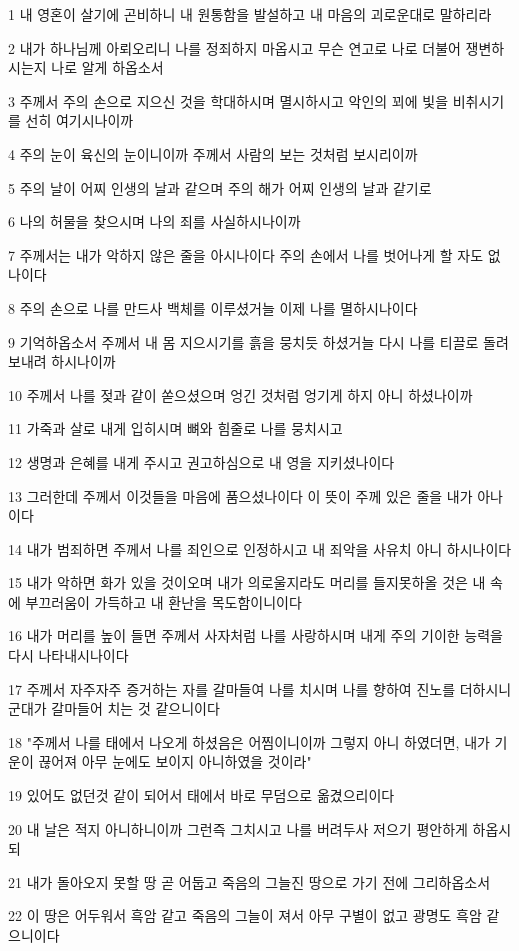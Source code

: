 \par 1 내 영혼이 살기에 곤비하니 내 원통함을 발설하고 내 마음의 괴로운대로 말하리라
\par 2 내가 하나님께 아뢰오리니 나를 정죄하지 마옵시고 무슨 연고로 나로 더불어 쟁변하시는지 나로 알게 하옵소서
\par 3 주께서 주의 손으로 지으신 것을 학대하시며 멸시하시고 악인의 꾀에 빛을 비취시기를 선히 여기시나이까
\par 4 주의 눈이 육신의 눈이니이까 주께서 사람의 보는 것처럼 보시리이까
\par 5 주의 날이 어찌 인생의 날과 같으며 주의 해가 어찌 인생의 날과 같기로
\par 6 나의 허물을 찾으시며 나의 죄를 사실하시나이까
\par 7 주께서는 내가 악하지 않은 줄을 아시나이다 주의 손에서 나를 벗어나게 할 자도 없나이다
\par 8 주의 손으로 나를 만드사 백체를 이루셨거늘 이제 나를 멸하시나이다
\par 9 기억하옵소서 주께서 내 몸 지으시기를 흙을 뭉치듯 하셨거늘 다시 나를 티끌로 돌려 보내려 하시나이까
\par 10 주께서 나를 젖과 같이 쏟으셨으며 엉긴 것처럼 엉기게 하지 아니 하셨나이까
\par 11 가죽과 살로 내게 입히시며 뼈와 힘줄로 나를 뭉치시고
\par 12 생명과 은혜를 내게 주시고 권고하심으로 내 영을 지키셨나이다
\par 13 그러한데 주께서 이것들을 마음에 품으셨나이다 이 뜻이 주께 있은 줄을 내가 아나이다
\par 14 내가 범죄하면 주께서 나를 죄인으로 인정하시고 내 죄악을 사유치 아니 하시나이다
\par 15 내가 악하면 화가 있을 것이오며 내가 의로울지라도 머리를 들지못하올 것은 내 속에 부끄러움이 가득하고 내 환난을 목도함이니이다
\par 16 내가 머리를 높이 들면 주께서 사자처럼 나를 사랑하시며 내게 주의 기이한 능력을 다시 나타내시나이다
\par 17 주께서 자주자주 증거하는 자를 갈마들여 나를 치시며 나를 향하여 진노를 더하시니 군대가 갈마들어 치는 것 같으니이다
\par 18 "주께서 나를 태에서 나오게 하셨음은 어찜이니이까 그렇지 아니 하였더면, 내가 기운이 끊어져 아무 눈에도 보이지 아니하였을 것이라"
\par 19 있어도 없던것 같이 되어서 태에서 바로 무덤으로 옮겼으리이다
\par 20 내 날은 적지 아니하니이까 그런즉 그치시고 나를 버려두사 저으기 평안하게 하옵시되
\par 21 내가 돌아오지 못할 땅 곧 어둡고 죽음의 그늘진 땅으로 가기 전에 그리하옵소서
\par 22 이 땅은 어두워서 흑암 같고 죽음의 그늘이 져서 아무 구별이 없고 광명도 흑암 같으니이다

